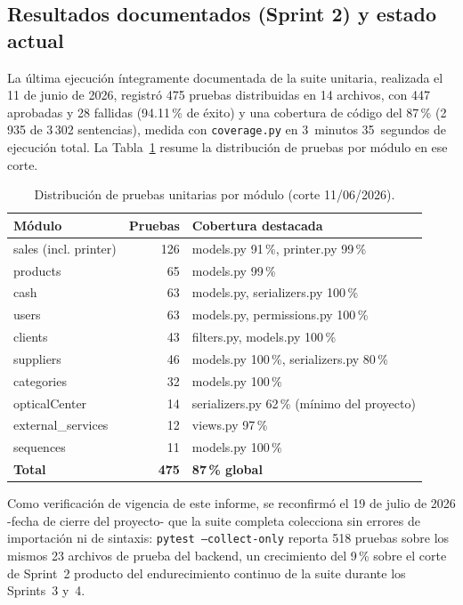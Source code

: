 \documentclass[conference]{IEEEtran}
\begin{document}
\subsection{Resultados documentados (Sprint 2) y estado actual}

La última ejecución íntegramente documentada de la suite unitaria, realizada el 11 de junio de 2026, registró 475 pruebas distribuidas en 14 archivos, con 447 aprobadas y 28 fallidas (94.11\,\% de éxito) y una cobertura de código del 87\,\% (2\,935 de 3\,302 sentencias), medida con \texttt{coverage.py} en 3~minutos 35~segundos de ejecución total. La Tabla~\ref{tab:unit} resume la distribución de pruebas por módulo en ese corte.

\begin{table}[htbp]
  \caption{Distribución de pruebas unitarias por módulo (corte 11/06/2026).}
  \label{tab:unit}
  \centering
  \footnotesize
  \begin{tabular}{l r l}
    \toprule
    \textbf{Módulo} & \textbf{Pruebas} & \textbf{Cobertura destacada} \\
    \midrule
    sales (incl. printer) & 126 & models.py 91\,\%, printer.py 99\,\% \\
    products & 65 & models.py 99\,\% \\
    cash & 63 & models.py, serializers.py 100\,\% \\
    users & 63 & models.py, permissions.py 100\,\% \\
    clients & 43 & filters.py, models.py 100\,\% \\
    suppliers & 46 & models.py 100\,\%, serializers.py 80\,\% \\
    categories & 32 & models.py 100\,\% \\
    opticalCenter & 14 & serializers.py 62\,\% (mínimo del proyecto) \\
    external\_services & 12 & views.py 97\,\% \\
    sequences & 11 & models.py 100\,\% \\
    \midrule
    \textbf{Total} & \textbf{475} & \textbf{87\,\% global} \\
    \bottomrule
  \end{tabular}
\end{table}

Como verificación de vigencia de este informe, se reconfirmó el 19 de julio de 2026 -fecha de cierre del proyecto- que la suite completa colecciona sin errores de importación ni de sintaxis: \texttt{pytest~--collect-only} reporta 518 pruebas sobre los mismos 23 archivos de prueba del backend, un crecimiento del 9\,\% sobre el corte de Sprint~2 producto del endurecimiento continuo de la suite durante los Sprints~3 y~4.
\end{document}

